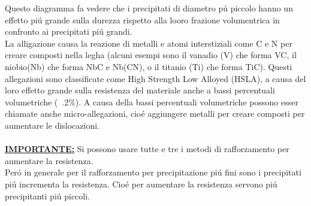 \documentclass{article}
\begin{document}
                Questo diagramma fa vedere che i precipitati di diametro p\'u piccolo hanno un effetto pi\'u grande sulla durezza rispetto alla looro frazione volumentrica in confronto ai precipitati pi\'u grandi.\\
                La alligazione causa la reazione di metalli e atomi interstiziali come C e N per creare composti nella legha (alcuni esempi sono il vanadio (V) che forma VC, il niobio(Nb) che forma NbC e Nb(CN), o il titanio (Ti) che forma TiC). Questi allegazioni sono classificate come High Strength Low Alloyed (HSLA), a causa del loro effetto grande sulla resistenza del materiale anche a bassi percentuali volumetriche (~.2\%). A causa della bassi percentuali volumetriche possono esser chiamate anche micro-allegazioni, cio\'e aggiungere metalli per creare composti per aumentare le dislocazioni.\\ \\
                \underline{\textbf{IMPORTANTE:}} Si possono usare tutte e tre i metodi di rafforzamento per aumentare la resistenza.\\ 
                Per\'o in generale per il rafforzamento per precipitazione pi\'u fini sono i precipitati pi\'u incrementa la resistenza. Cio\'e per aumentare la resistenza servono pi\'u precipitanti pi\'u piccoli.\\
\end{document}
